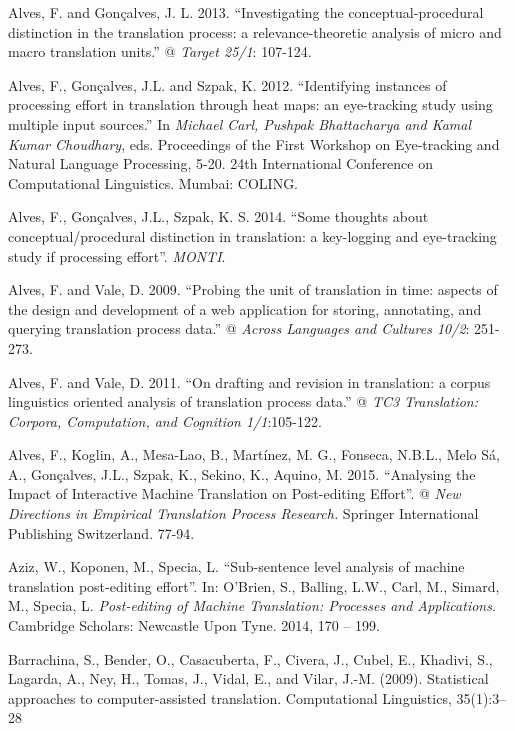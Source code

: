 \documentclass[output=paper]{langsci/langscibook}
\begin{document}
Alves, F. and Gonçalves, J. L. 2013. “Investigating the conceptual-procedural distinction in the translation process: a relevance-theoretic analysis of micro and macro translation units.” @ \textit{Target 25/1}: 107-124.



Alves, F., Gonçalves, J.L. and Szpak, K. 2012. “Identifying instances of processing effort in translation through heat maps: an eye-tracking study using multiple input sources.” In \textit{Michael Carl, Pushpak Bhattacharya and Kamal Kumar Choudhary}, eds. Proceedings of the First Workshop on Eye-tracking and Natural Language Processing, 5-20. 24th International Conference on Computational Linguistics. Mumbai: COLING.



Alves, F., Gonçalves, J.L., Szpak, K. S. 2014. “Some thoughts about conceptual/procedural distinction in translation: a key-logging and eye-tracking study if processing effort”. \textit{MONTI}.



Alves, F. and Vale, D. 2009. “Probing the unit of translation in time: aspects of the design and development of a web application for storing, annotating, and querying translation process data.” @ \textit{Across Languages and Cultures 10/2}: 251-273. 



Alves, F. and Vale, D. 2011. “On drafting and revision in translation: a corpus linguistics oriented analysis of translation process data.” @ \textit{TC3 Translation: Corpora, Computation, and Cognition 1/1}:105-122.



Alves, F., Koglin, A., Mesa-Lao, B., Martínez, M. G., Fonseca, N.B.L., Melo Sá, A., Gonçalves, J.L., Szpak, K., Sekino, K., Aquino, M. 2015. “Analysing the Impact of Interactive Machine Translation on Post-editing Effort”. @ \textit{New Directions in Empirical Translation Process Research.} Springer International Publishing Switzerland. 77-94.



Aziz, W., Koponen, M., Specia, L. “Sub-sentence level analysis of machine translation post-editing effort”. In: O’Brien, S., Balling, L.W., Carl, M., Simard, M., Specia, L. \textit{Post-editing of Machine Translation: Processes and Applications}. Cambridge Scholars: Newcastle Upon Tyne. 2014, 170 – 199.



Barrachina, S., Bender, O., Casacuberta, F., Civera, J., Cubel, E., Khadivi, S., Lagarda, A., Ney, H., Tomas, J., Vidal, E., and Vilar, J.-M. (2009). Statistical approaches to computer-assisted translation. Computational Linguistics, 35(1):3–28
\end{document}
